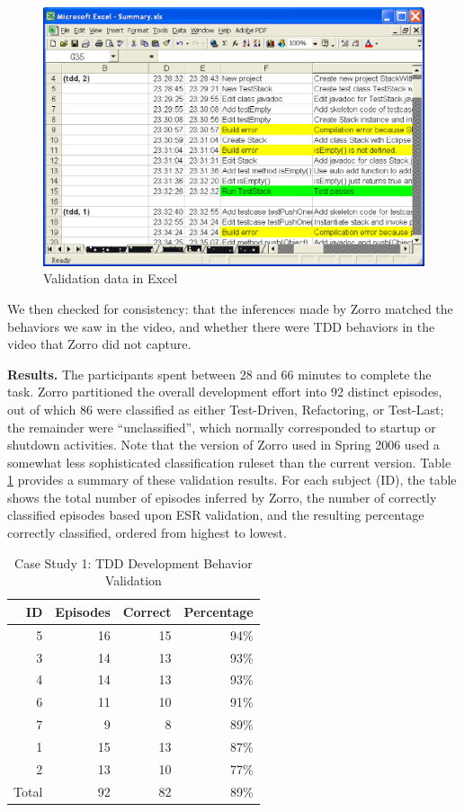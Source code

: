 \documentclass[smallextended]{svjour3}     %
\begin{document}
\begin{figure}[htbp]
  \centering
  \includegraphics[width=1.0\textwidth]{VideoScriptExcel}
  \caption{Validation data in Excel}
  \label{fig:VideoExcelScript}
\end{figure}

We then checked for consistency: that the inferences made by Zorro matched
the behaviors we saw in the video, and whether there were TDD behaviors in
the video that Zorro did not capture.

{\bf Results.}  The participants spent between 28 and 66 minutes to
complete the task.  Zorro partitioned the overall development effort into
92 distinct episodes, out of which 86 were classified as either
Test-Driven, Refactoring, or Test-Last; the remainder were
``unclassified'', which normally corresponded to startup or shutdown
activities.  Note that the version of Zorro used in Spring 2006 used a
somewhat less sophisticated classification ruleset than the current
version. Table \ref{tab:EsrPilotStudy} provides a summary of these
validation results. For each subject (ID), the table shows the total number
of episodes inferred by Zorro, the number of correctly classified episodes
based upon ESR validation, and the resulting percentage correctly
classified, ordered from highest to lowest.

\begin{table}[ht]
\centering
  \caption{Case Study 1: TDD Development Behavior Validation}
  \begin{tabular}{|r|r|r|r|}
  \hline
    ID & Episodes & Correct & Percentage \\ \hline
    5  & 16 &  15 & 94\% \\ \hline
    3  & 14 &  13 & 93\% \\ \hline
    4  & 14 &  13 & 93\% \\ \hline
    6  & 11 &  10 & 91\% \\ \hline
    7  &  9 &  8  & 89\% \\ \hline
    1  & 15 &  13 & 87\% \\ \hline
    2  & 13 &  10 & 77\% \\ \hline \hline
Total  & 92 & 82  & 89\% \\ 
  \hline
  \end{tabular}
  \label{tab:EsrPilotStudy}  
\end{table}
\end{document}
